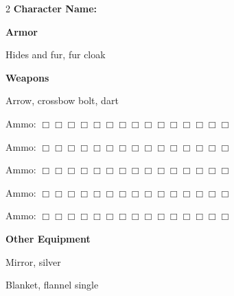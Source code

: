 \documentclass[10pt]{article}
\begin{document}
\begin{multicols}{2}
\textbf{Character Name:} \hrulefill

\vspace{24pt}

\textbf{Armor}


Hides and fur, fur cloak




\hrulefill


\hrulefill


\hrulefill



\vspace{24pt}

\textbf{Weapons}


Arrow, crossbow bolt, dart




\hrulefill

Ammo: $\Box \Box \Box \Box \Box \Box \Box \Box \Box \Box \Box \Box \Box \Box \Box$ 


\hrulefill

Ammo: $\Box \Box \Box \Box \Box \Box \Box \Box \Box \Box \Box \Box \Box \Box \Box$ 


\hrulefill

Ammo: $\Box \Box \Box \Box \Box \Box \Box \Box \Box \Box \Box \Box \Box \Box \Box$ 


\hrulefill

Ammo: $\Box \Box \Box \Box \Box \Box \Box \Box \Box \Box \Box \Box \Box \Box \Box$ 


\hrulefill

Ammo: $\Box \Box \Box \Box \Box \Box \Box \Box \Box \Box \Box \Box \Box \Box \Box$ 



\vspace{24pt}

\textbf{Other Equipment}


Mirror, silver


Blanket, flannel single




\hrulefill


\hrulefill


\hrulefill


\hrulefill


\hrulefill


\hrulefill


\hrulefill


\hrulefill


\hrulefill


\hrulefill



\end{multicols}
\end{document}
